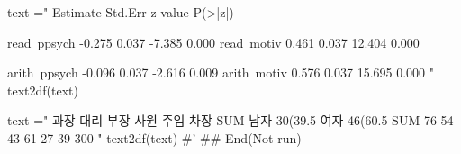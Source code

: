 \documentclass[a4paper]{book}
\begin{document}
\begin{Examples}
\begin{ExampleCode}
text ="                   Estimate  Std.Err  z-value  P(>|z|)

    read~ppsych           -0.275    0.037   -7.385    0.000
    read~motiv             0.461    0.037   12.404    0.000

    arith~ppsych           -0.096    0.037   -2.616    0.009
     arith~motiv             0.576    0.037   15.695    0.000
"
text2df(text)



text =" 과장 대리 부장 사원 주임 차장 SUM
남자 30(39.5%
여자 46(60.5%
SUM 76 54 43 61 27 39 300
"
text2df(text)
#' 
## End(Not run)

\end{ExampleCode}
\end{Examples}
\end{document}
